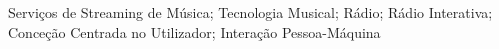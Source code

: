 \noindent Serviços de Streaming de Música; Tecnologia Musical; Rádio; Rádio Interativa; Conceção Centrada no Utilizador; Interação Pessoa-Máquina